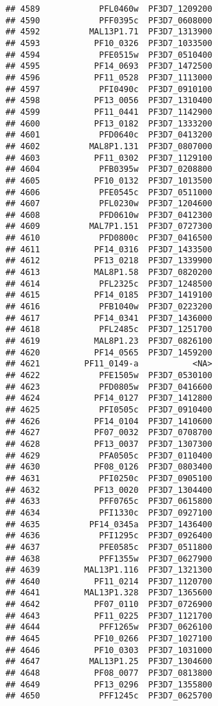 \documentclass{article}\usepackage[]{graphicx}\usepackage[]{color}
\makeatletter
\newenvironment{kframe}{%
 \def\at@end@of@kframe{}%
 \ifinner\ifhmode%
  \def\at@end@of@kframe{\end{minipage}}%
  \begin{minipage}{\columnwidth}%
 \fi\fi%
 \def\FrameCommand##1{\hskip\@totalleftmargin \hskip-\fboxsep
 \colorbox{shadecolor}{##1}\hskip-\fboxsep
     \hskip-\linewidth \hskip-\@totalleftmargin \hskip\columnwidth}%
 \MakeFramed {\advance\hsize-\width
   \@totalleftmargin\z@ \linewidth\hsize
   \@setminipage}}%
 {\par\unskip\endMakeFramed%
 \at@end@of@kframe}
\newenvironment{knitrout}{}{} %
\makeatother
\begin{document}
\begin{knitrout}
\begin{kframe}
\begin{verbatim}
## 4589            PFL0460w  PF3D7_1209200
## 4590            PFF0395c  PF3D7_0608000
## 4592          MAL13P1.71  PF3D7_1313900
## 4593           PF10_0326  PF3D7_1033500
## 4594            PFE0515w  PF3D7_0510400
## 4595           PF14_0693  PF3D7_1472500
## 4596           PF11_0528  PF3D7_1113000
## 4597            PFI0490c  PF3D7_0910100
## 4598           PF13_0056  PF3D7_1310400
## 4599           PF11_0441  PF3D7_1142900
## 4600           PF13_0182  PF3D7_1333200
## 4601            PFD0640c  PF3D7_0413200
## 4602          MAL8P1.131  PF3D7_0807000
## 4603           PF11_0302  PF3D7_1129100
## 4604            PFB0395w  PF3D7_0208800
## 4605           PF10_0132  PF3D7_1013500
## 4606            PFE0545c  PF3D7_0511000
## 4607            PFL0230w  PF3D7_1204600
## 4608            PFD0610w  PF3D7_0412300
## 4609          MAL7P1.151  PF3D7_0727300
## 4610            PFD0800c  PF3D7_0416500
## 4611           PF14_0316  PF3D7_1433500
## 4612           PF13_0218  PF3D7_1339900
## 4613           MAL8P1.58  PF3D7_0820200
## 4614            PFL2325c  PF3D7_1248500
## 4615           PF14_0185  PF3D7_1419100
## 4616            PFB1040w  PF3D7_0223200
## 4617           PF14_0341  PF3D7_1436000
## 4618            PFL2485c  PF3D7_1251700
## 4619           MAL8P1.23  PF3D7_0826100
## 4620           PF14_0565  PF3D7_1459200
## 4621         PF11_0149-a           <NA>
## 4622            PFE1505w  PF3D7_0530100
## 4623            PFD0805w  PF3D7_0416600
## 4624           PF14_0127  PF3D7_1412800
## 4625            PFI0505c  PF3D7_0910400
## 4626           PF14_0104  PF3D7_1410600
## 4627           PF07_0032  PF3D7_0708700
## 4628           PF13_0037  PF3D7_1307300
## 4629            PFA0505c  PF3D7_0110400
## 4630           PF08_0126  PF3D7_0803400
## 4631            PFI0250c  PF3D7_0905100
## 4632           PF13_0020  PF3D7_1304400
## 4633            PFF0765c  PF3D7_0615800
## 4634            PFI1330c  PF3D7_0927100
## 4635          PF14_0345a  PF3D7_1436400
## 4636            PFI1295c  PF3D7_0926400
## 4637            PFE0585c  PF3D7_0511800
## 4638            PFF1355w  PF3D7_0627900
## 4639         MAL13P1.116  PF3D7_1321300
## 4640           PF11_0214  PF3D7_1120700
## 4641         MAL13P1.328  PF3D7_1365600
## 4642           PF07_0110  PF3D7_0726900
## 4643           PF11_0225  PF3D7_1121700
## 4644            PFF1265w  PF3D7_0626100
## 4645           PF10_0266  PF3D7_1027100
## 4646           PF10_0303  PF3D7_1031000
## 4647          MAL13P1.25  PF3D7_1304600
## 4648           PF08_0077  PF3D7_0813800
## 4649           PF13_0296  PF3D7_1355800
## 4650            PFF1245c  PF3D7_0625700

\end{verbatim}
\end{kframe}
\end{knitrout}
\end{document}
